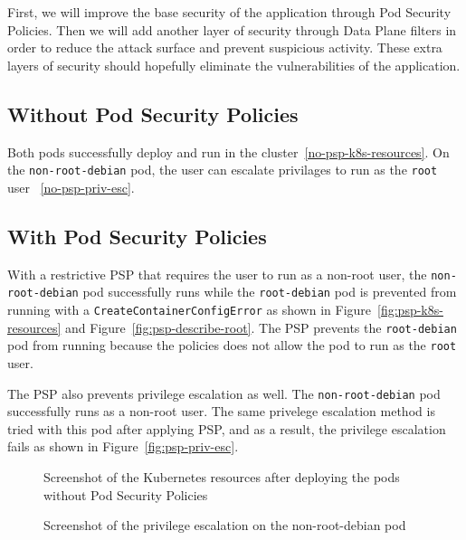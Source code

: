 First, we will improve the base security of the application through Pod Security Policies.
Then we will add another layer of security through Data Plane filters in order to reduce the
attack surface and prevent suspicious activity. These extra layers of security should hopefully
eliminate the vulnerabilities of the application.

\subsection{Without Pod Security Policies}
Both pods successfully deploy and run in the cluster~\ref{no-psp-k8s-resources}. On the 
\verb|non-root-debian| pod, the user can escalate privilages to run as the \verb|root| user ~\ref{no-psp-priv-esc}. 

\subsection{With Pod Security Policies}
With a restrictive PSP that requires the user to run as a non-root user, the \verb|non-root-debian| 
pod successfully runs while the \verb|root-debian| pod is prevented from running with a 
\verb|CreateContainerConfigError| as shown in Figure~\ref{fig:psp-k8s-resources} and 
Figure~\ref{fig:psp-describe-root}. The PSP prevents the \verb|root-debian| pod from running because
the policies does not allow the pod to run as the \verb|root| user.

The PSP also prevents privilege escalation as well. The \verb|non-root-debian| pod successfully runs
as a non-root user. The same privelege escalation method is tried with this pod after applying PSP,
and as a result, the privilege escalation fails as shown in Figure~\ref{fig:psp-priv-esc}.

\onecolumn

\begin{figure}[t]
  \begin{center}
    \vspace{-0.2in}
    \caption{Screenshot of the Kubernetes resources after deploying the pods without Pod Security Policies}
    \label{fig:no-psp-k8s-resources}
  \end{center}
\end{figure}

\begin{figure}[t]
  \begin{center}
    \vspace{-0.2in}
    \caption{Screenshot of the privilege escalation on the non-root-debian pod}
    \label{fig:no-psp-priv-esc}
  \end{center}
\end{figure}

